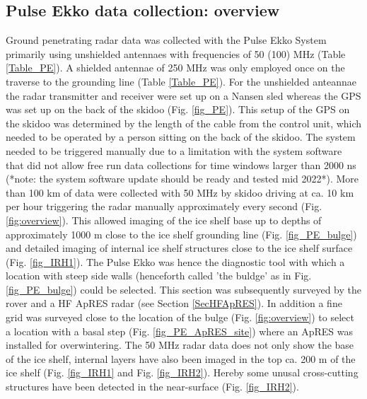\documentclass[a4paper,12pt]{article}
\begin{document}
\subsection{Pulse Ekko data collection: overview}
Ground penetrating radar data was collected with the Pulse Ekko System primarily using unshielded antennaes with frequencies of 50 (100) MHz (Table \ref{Table_PE}). A shielded antennae of 250 MHz was only employed once on the traverse to the grounding line (Table \ref{Table_PE}). For the unshielded anteannae the radar transmitter and receiver were set up on a Nansen sled whereas the GPS was set up on the back of the skidoo (Fig. \ref{fig_PE}). This setup of the GPS on the skidoo was determined by the length of the cable from the control unit, which needed to be operated by a person sitting on the back of the skidoo. The system needed to be triggered manually due to a limitation with the system software that did not allow free run data collections for time windows larger than 2000 ns (*note: the system software update should be ready and tested mid 2022*). More than 100 km of data were collected with 50 MHz by skidoo driving at ca. 10 km per hour triggering the radar manually approximately every second (Fig. \ref{fig:overview}). This allowed imaging of the ice shelf base up to depths of approximately 1000 m close to the ice shelf grounding line (Fig. \ref{fig_PE_bulge}) and detailed imaging of internal ice shelf structures close to the ice shelf surface (Fig. \ref{fig_IRH1}). The Pulse Ekko was hence the diagnostic tool with which a location with steep side walls (henceforth called 'the buldge' as in Fig. \ref{fig_PE_bulge}) could be selected. This section was subsequently surveyed by the rover and a HF ApRES radar (see Section \ref{SecHFApRES}). In addition a fine grid was surveyed close to the location of the bulge  (Fig. \ref{fig:overview}) to select a location with a basal step (Fig. \ref{fig_PE_ApRES_site}) where an ApRES was installed for overwintering. The 50 MHz radar data does not only show the base of the ice shelf, internal layers have also been imaged in the top ca. 200 m of the ice shelf (Fig. \ref{fig_IRH1} and Fig. \ref{fig_IRH2}). Hereby some unusal cross-cutting structures have been detected in the near-surface (Fig. \ref{fig_IRH2}).  
\end{document}
